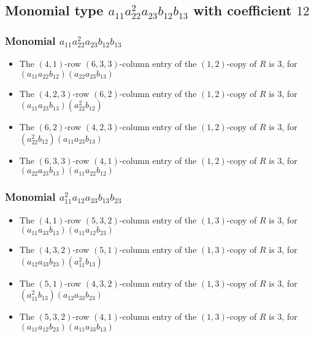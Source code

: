 \documentclass{article}
\begin{document}
\subsection{Monomial type $ a_{11} a_{22}^{2} a_{23} b_{12} b_{13} $ with coefficient $ 12 $}

\subsubsection{Monomial $ a_{11} a_{22}^{2} a_{23} b_{12} b_{13} $}

\begin{itemize}
\item The $(4, 1)$-row $(6, 3, 3)$-column entry of the $ \left(1, 2\right) $-copy of $R$ is $ 3 $, for $( a_{11} a_{22} b_{12} )( a_{22} a_{23} b_{13} )$ 
\item The $(4, 2, 3)$-row $(6, 2)$-column entry of the $ \left(1, 2\right) $-copy of $R$ is $ 3 $, for $( a_{11} a_{23} b_{13} )( a_{22}^{2} b_{12} )$ 
\item The $(6, 2)$-row $(4, 2, 3)$-column entry of the $ \left(1, 2\right) $-copy of $R$ is $ 3 $, for $( a_{22}^{2} b_{12} )( a_{11} a_{23} b_{13} )$ 
\item The $(6, 3, 3)$-row $(4, 1)$-column entry of the $ \left(1, 2\right) $-copy of $R$ is $ 3 $, for $( a_{22} a_{23} b_{13} )( a_{11} a_{22} b_{12} )$ 
\end{itemize}
\subsubsection{Monomial $ a_{11}^{2} a_{12} a_{33} b_{13} b_{23} $}

\begin{itemize}
\item The $(4, 1)$-row $(5, 3, 2)$-column entry of the $ \left(1, 3\right) $-copy of $R$ is $ 3 $, for $( a_{11} a_{33} b_{13} )( a_{11} a_{12} b_{23} )$ 
\item The $(4, 3, 2)$-row $(5, 1)$-column entry of the $ \left(1, 3\right) $-copy of $R$ is $ 3 $, for $( a_{12} a_{33} b_{23} )( a_{11}^{2} b_{13} )$ 
\item The $(5, 1)$-row $(4, 3, 2)$-column entry of the $ \left(1, 3\right) $-copy of $R$ is $ 3 $, for $( a_{11}^{2} b_{13} )( a_{12} a_{33} b_{23} )$ 
\item The $(5, 3, 2)$-row $(4, 1)$-column entry of the $ \left(1, 3\right) $-copy of $R$ is $ 3 $, for $( a_{11} a_{12} b_{23} )( a_{11} a_{33} b_{13} )$ 
\end{itemize}
\end{document}

